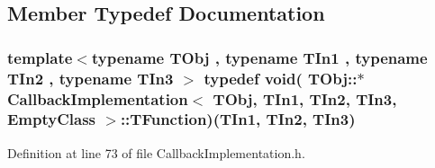 \subsection{Member Typedef Documentation}
\hypertarget{class_callback_implementation_3_01_t_obj_00_01_t_in1_00_01_t_in2_00_01_t_in3_00_01_empty_class_01_4_ae2effc19800057a6d73a828da5f26613}{
\subsubsection[{T\-Function}]{\setlength{\rightskip}{0pt plus 5cm}template$<$typename T\-Obj , typename T\-In1 , typename T\-In2 , typename T\-In3 $>$ typedef void( T\-Obj\-::$\ast$ {\bf Callback\-Implementation}$<$ T\-Obj, T\-In1, T\-In2, T\-In3, {\bf Empty\-Class} $>$\-::T\-Function)(T\-In1, T\-In2, T\-In3)}}\label{class_callback_implementation_3_01_t_obj_00_01_t_in1_00_01_t_in2_00_01_t_in3_00_01_empty_class_01_4_ae2effc19800057a6d73a828da5f26613}


Definition at line 73 of file Callback\-Implementation.\-h.



